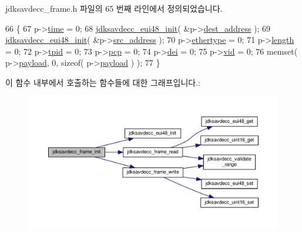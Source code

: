jdksavdecc\+\_\+frame.\+h 파일의 65 번째 라인에서 정의되었습니다.


\begin{DoxyCode}
66 \{
67     p->\hyperlink{structjdksavdecc__frame_adb3aaacbdb2a17782b3b1a077e98b7ef}{time} = 0;
68     \hyperlink{group__eui48_gae0bd9d7b819e8314b425d7c8bbae2333}{jdksavdecc\_eui48\_init}( &p->\hyperlink{structjdksavdecc__frame_a104d37031c593f66765dc66d8ac8962b}{dest\_address} );
69     \hyperlink{group__eui48_gae0bd9d7b819e8314b425d7c8bbae2333}{jdksavdecc\_eui48\_init}( &p->\hyperlink{structjdksavdecc__frame_a74855d22d112da72f29ba4959ebc639b}{src\_address} );
70     p->\hyperlink{structjdksavdecc__frame_aa9296c58dc24c63c4ee927db394a97d7}{ethertype} = 0;
71     p->\hyperlink{structjdksavdecc__frame_a1892eba2086d12ac2b09005aeb09ea3b}{length} = 0;
72     p->\hyperlink{structjdksavdecc__frame_a6732d2a618d68a2a54a3be2712852ee9}{tpid} = 0;
73     p->\hyperlink{structjdksavdecc__frame_a7f33a59d77ba03f3fc3cefd0d2f4f434}{pcp} = 0;
74     p->\hyperlink{structjdksavdecc__frame_a160cefca2111b7985c1ad181297c0a90}{dei} = 0;
75     p->\hyperlink{structjdksavdecc__frame_a139f10af6306ba74259c24567d70c42d}{vid} = 0;
76     memset( p->\hyperlink{structjdksavdecc__frame_a220ad076814a31ae0163e722e523de46}{payload}, 0, \textcolor{keyword}{sizeof}( p->\hyperlink{structjdksavdecc__frame_a220ad076814a31ae0163e722e523de46}{payload} ) );
77 \}
\end{DoxyCode}


이 함수 내부에서 호출하는 함수들에 대한 그래프입니다.\+:
\nopagebreak
\begin{figure}[H]
\begin{center}
\leavevmode
\includegraphics[width=350pt]{group__frame_ga14d8effbd6816c69743c5be3e98fea27_cgraph}
\end{center}
\end{figure}




